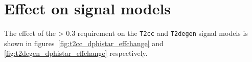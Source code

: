




\section{Effect on signal models}
The effect of the \mindphistar > 0.3 requirement on the \texttt{T2cc} and
\texttt{T2degen} signal models is shown in figures~\ref{fig:t2cc_dphistar_effchange}
and \ref{fig:t2degen_dphistar_effchange} respectively.

